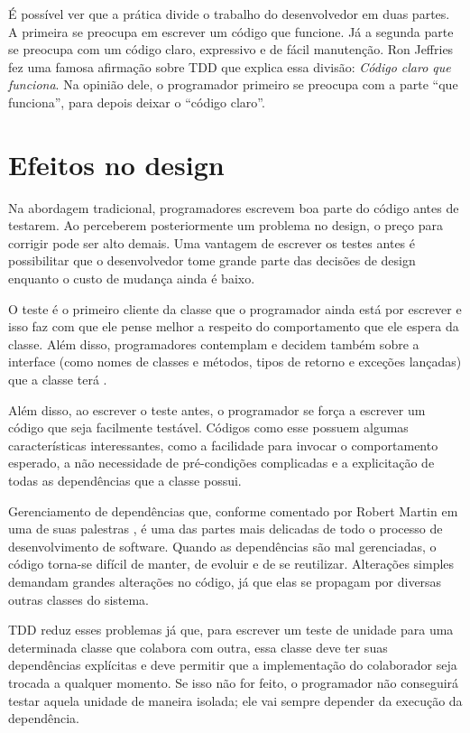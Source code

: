 É possível ver que a prática divide o trabalho do desenvolvedor em duas partes.
A primeira se preocupa em escrever um código que funcione. Já a segunda parte
se preocupa com um código claro, expressivo e de fácil manutenção. Ron Jeffries
fez uma famosa afirmação sobre TDD que explica essa divisão: \textit{Código
claro que funciona}. Na opinião dele, o programador primeiro se preocupa com a
parte ``que funciona'', para depois deixar o ``código claro''.

\section{Efeitos no design}

Na abordagem tradicional, programadores escrevem boa parte do código antes de
testarem. Ao perceberem posteriormente um problema no design, o preço para
corrigir pode ser alto demais. Uma vantagem de escrever os testes antes é
possibilitar que o desenvolvedor tome grande parte das decisões de design
enquanto o custo de mudança ainda é baixo.

O teste é o primeiro cliente da
classe que o programador ainda está por escrever e isso faz com que ele pense
melhor a respeito do comportamento que ele espera da classe. Além disso,
programadores contemplam e decidem também sobre a interface (como nomes de
classes e métodos, tipos de retorno e exceções lançadas) que a classe terá
\cite{tdd-influence}.

Além disso, ao escrever o teste antes, o programador se força a escrever um
código que seja facilmente testável. Códigos como esse possuem algumas
características interessantes, como a facilidade para invocar o comportamento
esperado, a não necessidade de pré-condições complicadas e a explicitação de
todas as dependências que a classe possui.

Gerenciamento de dependências que, conforme comentado por Robert Martin em uma
de suas palestras \cite{bobmartin-infoq}, é uma das partes mais delicadas de
todo o processo de desenvolvimento de software. Quando as dependências são mal
gerenciadas, o código torna-se difícil de manter, de evoluir e de se reutilizar.
Alterações simples demandam grandes alterações no código, já que elas se
propagam por diversas outras classes do sistema.

TDD reduz esses problemas já que, para escrever um teste de unidade para uma
determinada classe que colabora com outra, essa classe deve ter suas
dependências explícitas e deve permitir que a implementação do colaborador seja
trocada a qualquer momento. Se isso não for feito, o programador não conseguirá
testar aquela unidade de maneira isolada; ele vai sempre depender da execução da
dependência.

